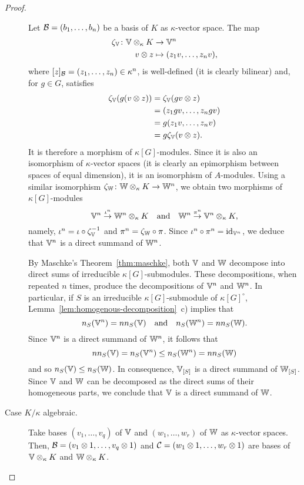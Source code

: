 \begin{proof}
\begin{description}
        Let $\mathcal B=(b_1,\dots,b_n)$ be a basis of $K$ as $\kappa$-vector space. The map
        \begin{align*}
            \zeta_\mathbb V\colon\mathbb V\otimes_\kappa K&\to\mathbb V^n\\
            v\otimes z&\mapsto(z_1v,\dots,z_nv),
        \end{align*}
        where $[z]_{\mathcal B}=(z_1,\dots,z_n)\in\kappa^n$, is well-defined (it is clearly bilinear) and, for $g\in G$, satisfies
        \begin{align*}
            \zeta_\mathbb V(g(v\otimes z))
                &= \zeta_\mathbb V(gv\otimes z)\\
                &=(z_1gv,\dots,z_ngv)\\
                &=g(z_1v,\dots,z_nv)\\
                &=g\zeta_\mathbb V(v\otimes z).
        \end{align*}
        It is therefore a morphism of $\kappa[G]$-modules. Since it is also an isomorphism of $\kappa$-vector spaces (it is clearly an epimorphism between spaces of equal dimension), it is an isomorphism of $A$-modules. Using a similar isomorphism $\zeta_\mathbb W\colon\mathbb W\otimes_\kappa K\to\mathbb W^n$, we obtain two morphisms of $\kappa[G]$-modules
        $$
            \mathbb V^n\stackrel{\iota^n}\to\mathbb W^n\otimes_\kappa K
                \quad\text{and}\quad
            \mathbb W^n\stackrel{\pi^n}\to\mathbb V^n\otimes_\kappa K,
        $$
        namely, $\iota^n=\iota\circ\zeta_\mathbb V^{-1}$ and $\pi^n=\zeta_\mathbb W\circ\pi$. Since $\iota^n\circ\pi^n=\operatorname{id}_{\mathbb V^n}$, we deduce that $\mathbb V^n$ is a direct summand of $\mathbb W^n$.
        
        By Maschke's Theorem~\ref{thm:maschke}, both $\mathbb V$ and $\mathbb W$ decompose into direct sums of irreducible $\kappa[G]$-submodules. These decompositions, when repeated $n$ times, produce the decompositions of $\mathbb V^n$ and $\mathbb W^n$. In particular, if $S$ is an irreducible $\kappa[G]$-submodule of $\kappa[G]^\circ$, Lemma~\ref{lem:homogenous-decomposition}~c) implies that
        $$
            n_S(\mathbb V^n)=nn_S(\mathbb V)
            \quad\text{and}\quad
            n_S(\mathbb W^n)=nn_S(\mathbb W).
        $$
        Since $\mathbb V^n$ is a direct summand of $\mathbb W^n$, it follows that
        $$
            nn_S(\mathbb V)=n_S(\mathbb V^n)\le n_S(\mathbb W^n)=nn_S(\mathbb W)
        $$
        and so $n_S(\mathbb V)\le n_S(\mathbb W)$. In consequence, $\mathbb V_{[S]}$ is a direct summand of $\mathbb W_{[S]}$. Since $\mathbb V$ and $\mathbb W$ can be decomposed as the direct sums of their homogeneous parts, we conclude that $\mathbb V$ is a direct summand of $\mathbb W$.
        
        \item[Case $K/\kappa$ algebraic.] Take bases $(v_1,\dots,v_q)$ of $\mathbb V$ and $(w_1,\dots,w_r)$ of $\mathbb W$ as $\kappa$-vector spaces. Then, $\mathcal B=(v_1\otimes1,\dots,v_q\otimes1)$ and $\mathcal C=(w_1\otimes1,\dots,w_r\otimes1)$ are bases of $\mathbb V\otimes_\kappa K$ and $\mathbb W\otimes_\kappa K$.
    

\end{description}
\end{proof}
